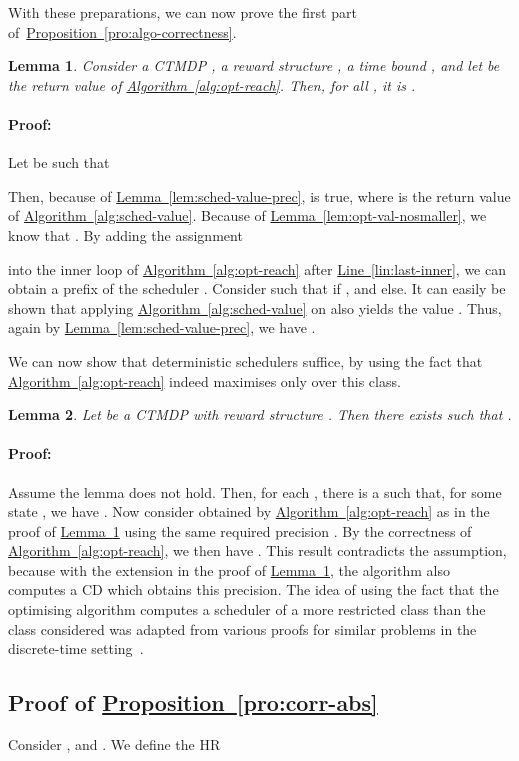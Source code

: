 \documentclass[10pt,twocolumn]{article}
\newenvironment{proof}{\paragraph{Proof:}}{\hfill}
\newtheorem{lemma}{Lemma}
\newcommand{\reflem}[1]{\texorpdfstring{\hyperref[lem:#1]{Lemma~\ref*{lem:#1}}}{Lemma~\ref*{lem:#1}}}
\newcommand{\refpro}[1]{\texorpdfstring{\hyperref[pro:#1]{Proposition~\ref*{pro:#1}}}{Proposition~\ref*{pro:#1}}}
\newcommand{\refalg}[1]{\texorpdfstring{\hyperref[alg:#1]{Algorithm~\ref*{alg:#1}}}{Algorithm~\ref*{alg:#1}}}
\newcommand{\reflin}[1]{\texorpdfstring{\hyperref[lin:#1]{Line~\ref*{lin:#1}}}{Line~\ref*{lin:#1}}}
\begin{document}
With these preparations, we can now prove the first part of~\refpro{algo-correctness}.
\begin{lemma}
\label{lem:algo-correctness}
Consider a CTMDP , a reward structure , a time bound , and let  be the return value of \refalg{opt-reach}.
Then, for all , it is .
\end{lemma}

\begin{proof}
  Let  be such that

Then, because of \reflem{sched-value-prec},  is true,
  where  is the return value of \refalg{sched-value}.
  Because of \reflem{opt-val-nosmaller}, we know that .
  By adding the assignment

into the inner loop of \refalg{opt-reach} after \reflin{last-inner}, we can obtain a prefix of the scheduler .
  Consider  such that  if ,
  and  else.
  It can easily be shown that applying \refalg{sched-value} on  also yields the value .
  Thus, again by \reflem{sched-value-prec}, we have .
\end{proof}

We can now show that deterministic schedulers suffice, by using the fact that \refalg{opt-reach} indeed maximises only over this class.
\begin{lemma}
  Let  be a CTMDP with reward structure .
  Then there exists  such that .
\end{lemma}

\begin{proof}
  Assume the lemma does not hold.
  Then, for each , there is a  such that, for some state ,
  we have .
  Now consider  obtained by \refalg{opt-reach} as in the proof of \reflem{algo-correctness} using the same required precision .
  By the correctness of \refalg{opt-reach}, we then have .
  This result contradicts the assumption, because with the extension in the proof of \reflem{algo-correctness},
  the algorithm also computes a CD which obtains this precision.
\end{proof}
The idea of using the fact that the optimising algorithm computes a scheduler of a more restricted class than the class considered was adapted from various proofs for similar problems in the discrete-time setting~\cite{Puterman94}.

\subsection*{Proof of \refpro{corr-abs}}
\label{apx:corr-abs}
\noindent
Consider , and
.
We define the HR
\end{document}
